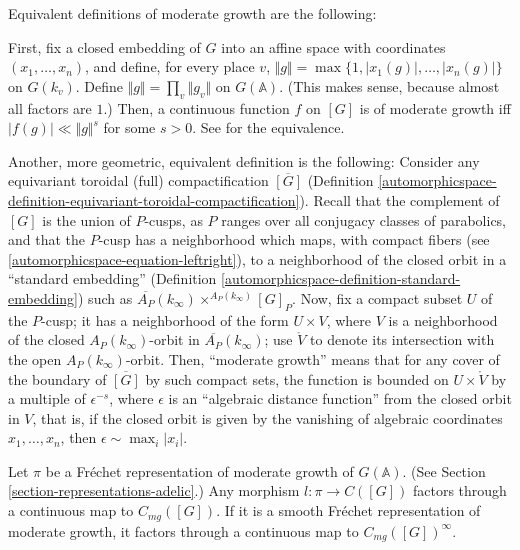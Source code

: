 \begin{remark}
 \label{remark-moderate-growth-definitions}
Equivalent  definitions of moderate growth are the following: 

First, fix a closed embedding of $G$ into an affine space with coordinates $(x_1, \dots, x_n)$, and define, for every place $v$,  $\Vert g\Vert = \max\{1, |x_1(g)|, \dots, |x_n(g)|\}$ on $G(k_v)$. Define $\Vert g\Vert = \prod_v \Vert g_v \Vert $ on $G(\mathbb A)$. (This makes sense, because almost all factors are $1$.) Then, a continuous function $f$ on $[G]$ is of moderate growth iff $|f(g)|\ll \Vert g\Vert^s$ for some $s>0$. See \cite[I.2.2]{MW} for the equivalence.

Another, more geometric, equivalent definition is the following: Consider any equivariant toroidal (full) compactification $\overline{[G]}$ (Definition \ref{automorphicspace-definition-equivariant-toroidal-compactification}). Recall that the complement of $[G]$ is the union of $P$-cusps, as $P$ ranges over all conjugacy classes of parabolics, and that the $P$-cusp has a neighborhood which maps, with compact fibers (see \eqref{automorphicspace-equation-leftright}), to a neighborhood of the closed orbit in a ``standard embedding'' (Definition \ref{automorphicspace-definition-standard-embedding}) such as $\overline{A_P}(k_\infty) \times^{A_P(k_\infty)} [G]_P$. Now, fix a compact subset $U$ of the $P$-cusp; it has a neighborhood of the form $U\times V$, where $V$ is a neighborhood of the closed $A_P(k_\infty)$-orbit in $\overline{A_P}(k_\infty)$; use $\mathring V$ to denote its intersection with the open $A_P(k_\infty)$-orbit. Then, ``moderate growth'' means that for any cover of the boundary of $\overline{[G]}$ by such compact sets, the function is bounded on $U\times \mathring V$ by a multiple of $\epsilon^{-s}$, where $\epsilon$ is an ``algebraic distance function'' from the closed orbit in $V$, that is, if the closed orbit is given by the vanishing of algebraic coordinates $x_1, \dots, x_n$, then $\epsilon \sim \max_i |x_i|$. 

\end{remark}


\begin{proposition}
 \label{proposition-moderate-growth}
Let $\pi$ be a Fr\'echet representation of moderate growth of $G(\mathbb A)$. (See Section \ref{section-representations-adelic}.) Any morphism $l:\pi\to C([G])$ factors through a continuous map to $C_{mg}([G])$. If it is a smooth Fr\'echet representation of moderate growth, it factors through a continuous map to $C_{mg}([G])^\infty$.
\end{proposition}

